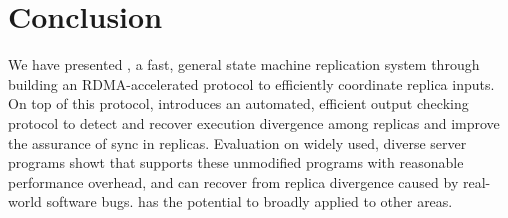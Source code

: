 \section{Conclusion}\label{sec:conclusion}

We have presented \xxx, a fast, general state machine replication system 
through building an RDMA-accelerated \paxos protocol to efficiently coordinate 
replica inputs. On top of this protocol, \xxx introduces an automated, 
efficient output checking protocol to detect and recover execution divergence 
among replicas and improve the assurance of sync in replicas. Evaluation on 
widely used, diverse server programs showt that \xxx supports these unmodified 
programs with reasonable performance overhead, and can recover from replica 
divergence caused by real-world software bugs. \xxx has the potential to 
broadly applied to other areas.
